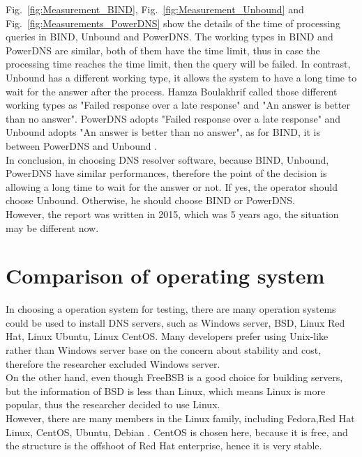 Fig.~\ref{fig:Measurement_BIND}, Fig.~\ref{fig:Measurement_Unbound} and Fig.~\ref{fig:Measurements_PowerDNS} show the details of the time of processing queries in BIND, Unbound and PowerDNS. The working types in BIND and PowerDNS are similar, both of them have the time limit, thus in case the processing time reaches the time limit, then the query will be failed. In contrast, Unbound has a different working type, it allows the system to have a long time to wait for the answer after the process. Hamza Boulakhrif called those different working types as "Failed response over a late response" and "An answer is better than no answer". PowerDNS adopts "Failed response over a late response" and Unbound adopts "An answer is better than no answer", as for BIND, it is between PowerDNS and Unbound \cite{DNS_resolver_performance_measurements}.
\\

In conclusion, in choosing DNS resolver software, because BIND, Unbound, PowerDNS have similar performances, therefore the point of the decision is allowing a long time to wait for the answer or not. If yes, the operator should choose Unbound. Otherwise, he should choose BIND or PowerDNS.
\\

However, the report was written in 2015, which was 5 years ago, the situation may be different now.
\\

\section{Comparison of operating system}

In choosing a operation system for testing, there are many operation systems could be used to install DNS servers, such as Windows server, BSD, Linux Red Hat, Linux Ubuntu, Linux CentOS. Many developers prefer using Unix-like rather than Windows server base on the concern about stability and cost, therefore the researcher excluded Windows server.
\\

On the other hand, even though FreeBSB is a good choice for building servers, but the information of BSD is less than Linux, which means Linux is more popular, thus the researcher decided to use Linux.
\\

However, there are many members in the Linux family, including Fedora,Red Hat Linux, CentOS, Ubuntu, Debian \cite{Linux_distributions}. CentOS is chosen here, because it is free, and the structure is the offshoot of Red Hat enterprise, hence it is very stable. 
\\

